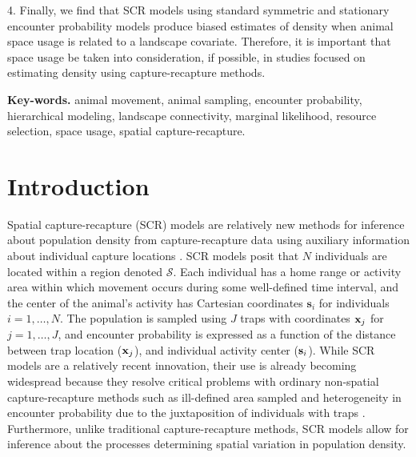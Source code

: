 \documentclass[12pt]{article}
\begin{document}
4. Finally, we find that SCR
models using standard symmetric and stationary encounter probability
models produce biased estimates of density when animal space
usage is related to a landscape covariate. Therefore, it is
important that space usage be taken into consideration, if
possible, in studies focused on estimating density using
capture-recapture methods.

\vspace{.2in}

{\bf Key-words. }
animal movement, animal sampling, encounter
probability, hierarchical modeling, landscape connectivity, marginal likelihood,
resource selection, space usage,  spatial capture-recapture. \\


\section{Introduction}

Spatial capture-recapture (SCR) models are relatively new methods for
inference about population density from capture-recapture data using
auxiliary information about individual capture locations
\citep{efford:2004,borchers_efford:2008, royle_young:2008}.  SCR
models posit that $N$ individuals are located within a region denoted
$\mathcal{S}$. Each individual has a home range or activity area
within which movement occurs during some well-defined time interval,
and the center of the animal's activity has Cartesian coordinates
$\mathbf{s}_i$ for individuals $i=1,\ldots,N$. The population is sampled using $J$
traps with coordinates ${\bf x}_{j}$ for $j=1,\ldots,J$, and encounter
probability is expressed as a function of the distance between trap
location (${\bf x}_{j}$), and individual activity center (${\bf
  s}_{i}$).
While SCR models are a relatively recent innovation, their use is already becoming widespread
\citep{efford_etal:2009ecol, gardner_etal:2010jwm,
  gardner_etal:2010ecol,kery_etal:2010, gopalaswamy_etal:2012,
  foster_harmsen:2012} because they resolve critical problems with
ordinary non-spatial capture-recapture methods such as ill-defined
area sampled and heterogeneity in encounter probability due to the
juxtaposition of individuals with traps
\citep{borchers:2011}. %
Furthermore, unlike traditional capture-recapture methods, SCR models
allow for inference about the processes determining %
spatial variation in population density.
\end{document}
